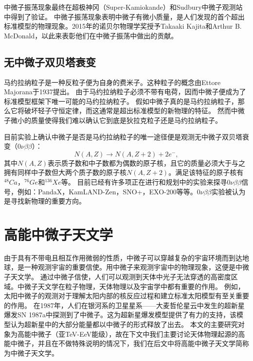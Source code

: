 中微子振荡现象最终在超极神冈（Super-Kamiokande）和Sudbury中微子观测站中得到了验证\cite{Super-K:1998, Sudbury:2001}。
中微子振荡现象表明中微子有微小质量，是人们发现的首个超出标准模型的物理现象。2015年的诺贝尔物理学奖授予Takaaki Kajita和Arthur B. McDonald，以此来表彰他们在中微子振荡中做出的贡献。


\subsection{无中微子双贝塔衰变}

马约拉纳粒子是一种反粒子便为自身的费米子。这种粒子的概念由Ettore Majorana于1937提出。
由于马约拉纳粒子必须不带有电荷，因而中微子便成为了标准模型框架下唯一可能的马约拉纳粒子。
假如中微子真的是马约拉纳粒子，那么它将破坏轻子守恒定律，而这通常是超出标准模型的新物理的特征。
然而中微子微小的质量使得我们难以确认它到底是狄拉克粒子还是马约拉纳粒子。

目前实验上确认中微子是否是马约拉纳粒子的唯一途径便是观测无中微子双贝塔衰变（$0\nu\beta\beta$）：
\begin{equation}
    N(A, Z) \rightarrow N(A, Z+2) +2 e^{-} ,
    \label{eq: double beta decay}
\end{equation}
其中$N(A, Z)$表示质子数和中子数都为偶数的原子核，且它的质量必须大于与之拥有同样中子数但大两个质子数的原子核$N(A, Z+2)$。满足该特征的原子核有$^{48}Ca$，$^{76}Ge$和$^{136}Xe$等。
目前已经有许多项正在进行和规划中的实验来探寻$0\nu\beta\beta$信号，例如：PandaX\cite{PandaX-II:2019}，KamLAND-Zen\cite{KamLAND-Zen:2016}，SNO+\cite{SNO_Plus:2021}，EXO-200\cite{EXO-200:2012}等等。$0\nu\beta\beta$实验被认为是寻找新物理的重要方向。


\section{高能中微子天文学}

由于具有不带电且相互作用微弱的性质，中微子可以穿越复杂的宇宙环境而到达地球，是一种观测宇宙的重要信使。用中微子来观测宇宙中的物理现象，这便是中微子天文学。
通过中微子信使，人们可以观测到天体中光子无法穿透的高密度区域。中微子天文学在粒子物理，天体物理以及宇宙学中都有重要的作用。
例如，太阳中微子的观测对于理解太阳内部的核反应过程和建立标准太阳模型有至关重要的作用\cite{Bahcall_solar_model:2005}。
在1987年，人们在银河系的卫星星系——大麦哲伦星云中发生的超新星爆发SN 1987a中探测到了中微子\cite{Hirata_sn:1987, Bionta_sn:1987}。这为超新星爆发模型提供了有力的支持，该模型认为超新星中的大部分能量都以中微子的形式释放了出去。
本文的主要研究对象为高能中微子（亚TeV-EeV能级），故在下文中我们主要讨论天体物理起源的高能中微子，并且在不做特殊说明的情况下，我们在后文中将高能中微子天文学简称为中微子天文学。

